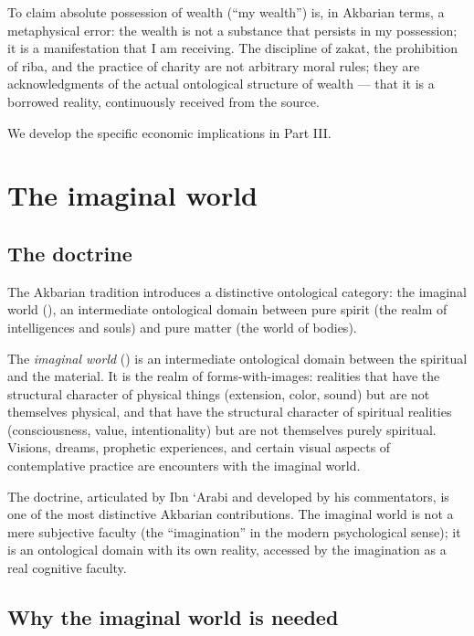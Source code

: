 To claim absolute possession of wealth (``my wealth'') is, in
Akbarian terms, a metaphysical error: the wealth is not a substance
that persists in my possession; it is a manifestation that I am
receiving. The discipline of zakat, the prohibition of riba, and
the practice of charity are not arbitrary moral rules; they are
acknowledgments of the actual ontological structure of wealth ---
that it is a borrowed reality, continuously received from the source.

We develop the specific economic implications in Part III.

\section{The imaginal world}
\label{sec:imaginal-world}

\subsection{The doctrine}

The Akbarian tradition introduces a distinctive ontological category:
the imaginal world (), an intermediate
ontological domain between pure spirit (the realm of intelligences
and souls) and pure matter (the world of bodies).

\begin{definition}
\label{def:imaginal-world}
The \emph{imaginal world} () is an intermediate
ontological domain between the spiritual and the material. It is
the realm of forms-with-images: realities that have the structural
character of physical things (extension, color, sound) but are not
themselves physical, and that have the structural character of
spiritual realities (consciousness, value, intentionality) but are
not themselves purely spiritual. Visions, dreams, prophetic
experiences, and certain visual aspects of contemplative practice
are encounters with the imaginal world.
\end{definition}

The doctrine, articulated by Ibn `Arabi and developed by his
commentators, is one of the most distinctive Akbarian contributions.
The imaginal world is not a mere subjective faculty (the
``imagination'' in the modern psychological sense); it is an
ontological domain with its own reality, accessed by the
imagination as a real cognitive faculty.

\subsection{Why the imaginal world is needed}

